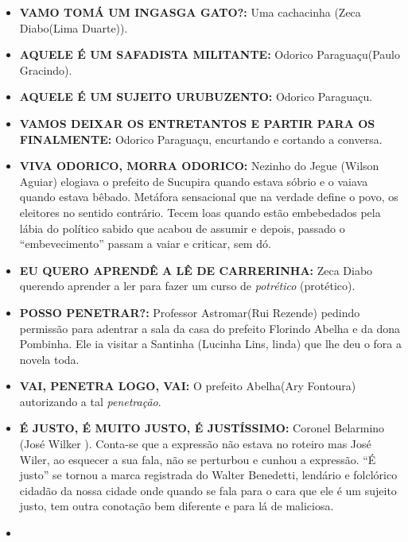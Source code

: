 \documentclass[12pt,brazil,]{book}
\providecommand{\tightlist}{%
  \setlength{\itemsep}{0pt}\setlength{\parskip}{0pt}}
\begin{document}
\begin{itemize}
\tightlist
\item
  \textbf{VAMO TOMÁ UM INGASGA GATO?:} Uma cachacinha (Zeca Diabo(Lima
  Duarte)).\\
\item
  \textbf{AQUELE É UM SAFADISTA MILITANTE:} Odorico Paraguaçu(Paulo
  Gracindo).\\
\item
  \textbf{AQUELE É UM SUJEITO URUBUZENTO:} Odorico Paraguaçu.\\
\item
  \textbf{VAMOS DEIXAR OS ENTRETANTOS E PARTIR PARA OS FINALMENTE:}
  Odorico Paraguaçu, encurtando e cortando a conversa.\\
\item
  \textbf{VIVA ODORICO, MORRA ODORICO:} Nezinho do Jegue (Wilson Aguiar)
  elogiava o prefeito de Sucupira quando estava sóbrio e o vaiava quando
  estava bêbado. Metáfora sensacional que na verdade define o povo, os
  eleitores no sentido contrário. Tecem loas quando estão embebedados
  pela lábia do político sabido que acabou de assumir e depois, passado
  o ``embevecimento'' passam a vaiar e criticar, sem dó.\\
\item
  \textbf{EU QUERO APRENDÊ A LÊ DE CARRERINHA:} Zeca Diabo querendo
  aprender a ler para fazer um curso de \emph{potrético} (protético).\\
\item
  \textbf{POSSO PENETRAR?:} Professor Astromar(Rui Rezende) pedindo
  permissão para adentrar a sala da casa do prefeito Florindo Abelha e
  da dona Pombinha. Ele ia visitar a Santinha (Lucinha Lins, linda) que
  lhe deu o fora a novela toda.\\
\item
  \textbf{VAI, PENETRA LOGO, VAI:} O prefeito Abelha(Ary Fontoura)
  autorizando a tal \emph{penetração}.\\
\item
  \textbf{É JUSTO, É MUITO JUSTO, É JUSTÍSSIMO:} Coronel Belarmino (José
  Wilker ). Conta-se que a expressão não estava no roteiro mas José
  Wiler, ao esquecer a sua fala, não se perturbou e cunhou a expressão.
  ``É justo'' se tornou a marca registrada do Walter Benedetti, lendário
  e folclórico cidadão da nossa cidade onde quando se fala para o cara
  que ele é um sujeito justo, tem outra conotação bem diferente e para
  lá de maliciosa.\\
\item

\end{itemize}
\end{document}
